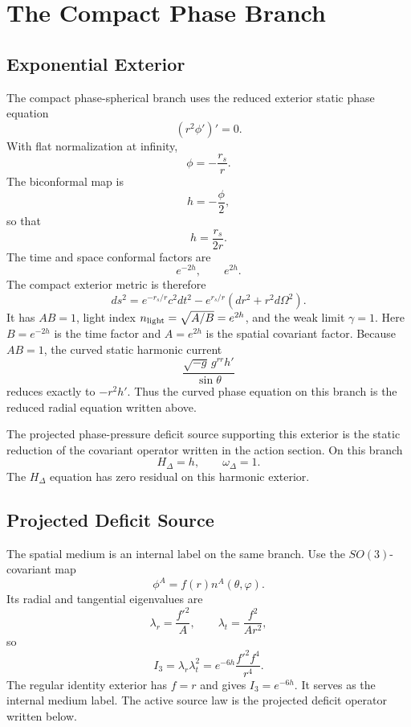 \documentclass[12pt,a4paper]{article}
\begin{document}
\section{The Compact Phase Branch}

\subsection{Exponential Exterior}

The compact phase-spherical branch uses the reduced exterior static phase equation
\[
\left(r^2\phi'\right)'=0.
\]
With flat normalization at infinity,
\[
\phi=-\frac{r_s}{r}.
\]
The biconformal map is
\[
h=-\frac{\phi}{2},
\]
so that
\[
h=\frac{r_s}{2r}.
\]
The time and space conformal factors are
\[
e^{-2h},\qquad e^{2h}.
\]
The compact exterior metric is therefore
\[
ds^2=e^{-r_s/r}c^2dt^2
-e^{r_s/r}\left(dr^2+r^2d\Omega^2\right).
\]
It has $AB=1$, light index $n_{\rm light}=\sqrt{A/B}=e^{2h}$, and the weak limit $\gamma=1$. Here $B=e^{-2h}$ is the time factor and $A=e^{2h}$ is the spatial covariant factor.
Because $AB=1$, the curved static harmonic current
\[
\frac{\sqrt{-g}\,g^{rr}h'}{\sin\theta}
\]
reduces exactly to $-r^2h'$. Thus the curved phase equation on this branch is
the reduced radial equation written above.

The projected phase-pressure deficit source supporting this exterior is the
static reduction of the covariant operator written in the action section. On this branch
\[
H_\Delta=h,\qquad \omega_\Delta=1.
\]
The $H_\Delta$ equation has zero residual on this harmonic exterior.

\subsection{Projected Deficit Source}

The spatial medium is an internal label on the same branch. Use the
$SO(3)$-covariant map
\[
\phi^A=f(r)n^A(\theta,\varphi).
\]
Its radial and tangential eigenvalues are
\[
\lambda_r=\frac{f'^2}{A},\qquad
\lambda_t=\frac{f^2}{Ar^2},
\]
so
\[
I_3=\lambda_r\lambda_t^2
=e^{-6h}\frac{f'^2f^4}{r^4}.
\]
The regular identity exterior has $f=r$ and gives $I_3=e^{-6h}$. It serves as
the internal medium label. The active source law is the projected deficit
operator written below.
\end{document}
